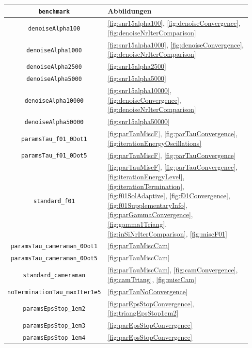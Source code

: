 \begin{table}[p]
  \centering
  \begin{tabular}{c|p{8.7cm}}
    \hline
    \texttt{benchmark} & Abbildungen\\  
    \hline 
    \texttt{denoiseAlpha100} &
    \ref{fig:snr15alpha100}, \ref{fig:denoiseConvergence},
    \ref{fig:denoiseNrIterComparison}\\
    \texttt{denoiseAlpha1000} &
    \ref{fig:snr15alpha1000}, \ref{fig:denoiseConvergence},
    \ref{fig:denoiseNrIterComparison}\\
    \texttt{denoiseAlpha2500} &
    \ref{fig:snr15alpha2500}\\
    \texttt{denoiseAlpha5000} &
    \ref{fig:snr15alpha5000}\\
    \texttt{denoiseAlpha10000} &
    \ref{fig:snr15alpha10000}, \ref{fig:denoiseConvergence}, 
    \ref{fig:denoiseNrIterComparison}\\
    \texttt{denoiseAlpha50000} &
    \ref{fig:snr15alpha50000}\\
    \texttt{paramsTau\_f01\_0Dot1} &
    \ref{fig:parTauMiscF}, \ref{fig:parTauConvergence},
    \ref{fig:iterationEnergyOscillations}\\
    \texttt{paramsTau\_f01\_0Dot5} &
    \ref{fig:parTauMiscF}, \ref{fig:parTauConvergence}\\
    \texttt{standard\_f01} &
    \ref{fig:parTauMiscF}, \ref{fig:parTauConvergence}, 
    \ref{fig:iterationEnergyLevel}, \ref{fig:iterationTermination},
    \ref{fig:f01SolAdaptive}, \ref{fig:f01Convergence}, 
    \ref{fig:f01SupplementaryInfo}, \ref{fig:parGammaConvergence},
    \ref{fig:gamma1Triang}, \ref{fig:inSiNrIterComparison},
    \ref{fig:miscF01}\\
    \texttt{paramsTau\_cameraman\_0Dot1} &
    \ref{fig:parTauMiscCam}\\
    \texttt{paramsTau\_cameraman\_0Dot5} &
    \ref{fig:parTauMiscCam} \\
    \texttt{standard\_cameraman} &
    \ref{fig:parTauMiscCam}, \ref{fig:camConvergence}, \ref{fig:camTriang},
    \ref{fig:miscCam}\\
    \texttt{noTerminationTau\_maxIter1e5} &
    \ref{fig:parTauNoConvergence}\\
    \texttt{paramsEpsStop\_1em2} &
    \ref{fig:parEpsStopConvergence}, \ref{fig:triangEpsStop1em2}\\
    \texttt{paramsEpsStop\_1em3} &
    \ref{fig:parEpsStopConvergence}\\
    \texttt{paramsEpsStop\_1em4} &
    \ref{fig:parEpsStopConvergence}\\

\end{tabular}
\end{table}
